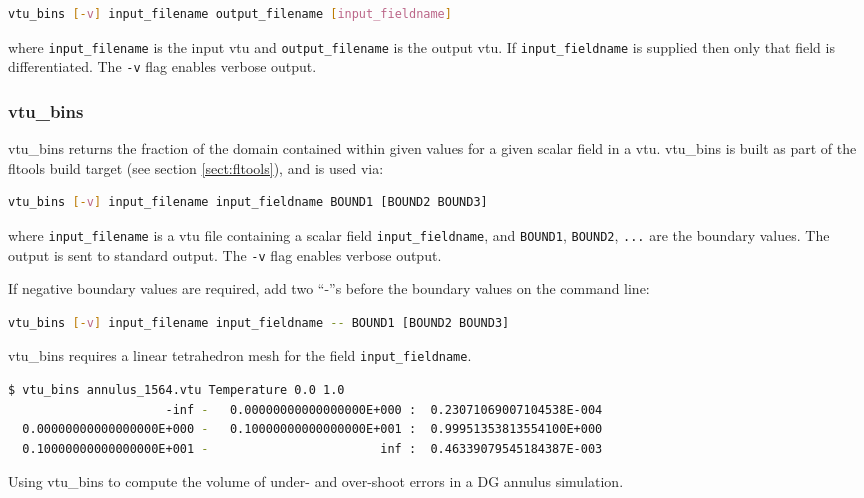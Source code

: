 \begin{lstlisting}[language = Bash]
vtu_bins [-v] input_filename output_filename [input_fieldname]
\end{lstlisting}

where \lstinline[language = Bash]+input_filename+ is the input vtu and
\lstinline[language = Bash]+output_filename+ is the output vtu. If
\lstinline[language = Bash]+input_fieldname+ is supplied then only that field
is differentiated. The \lstinline[language = Bash]+-v+ flag enables verbose output.


\subsubsection{vtu\_bins}
\label{sect:vtu_bins}

vtu\_bins returns the fraction of the domain contained within given values
for a given scalar field in a vtu. vtu\_bins is built as part of the fltools
build target (see section \ref{sect:fltools}), and is used via:

\begin{lstlisting}[language = Bash]
vtu_bins [-v] input_filename input_fieldname BOUND1 [BOUND2 BOUND3]
\end{lstlisting}

where \lstinline[language = Bash]+input_filename+ is a vtu file containing a scalar
field \lstinline[language = Bash]+input_fieldname+, and
\lstinline[language = Bash]+BOUND1+, \lstinline[language = Bash]+BOUND2+,
\lstinline[language = Bash]+...+ are the boundary values. The output is sent to
standard output. The \lstinline[language = Bash]+-v+ flag enables verbose output.

If negative boundary values are required, add two ``-''s before the boundary
values on the command line:

\begin{lstlisting}[language = Bash]
vtu_bins [-v] input_filename input_fieldname -- BOUND1 [BOUND2 BOUND3]
\end{lstlisting}

vtu\_bins requires a linear tetrahedron mesh for the field
\lstinline[language = Bash]+input_fieldname+.

\begin{example}
  \begin{lstlisting}[language = Bash]
$ vtu_bins annulus_1564.vtu Temperature 0.0 1.0
                      -inf -   0.00000000000000000E+000 :  0.23071069007104538E-004
  0.00000000000000000E+000 -   0.10000000000000000E+001 :  0.99951353813554100E+000
  0.10000000000000000E+001 -                        inf :  0.46339079545184387E-003
  \end{lstlisting}
\caption{Using vtu\_bins to compute the volume of under- and over-shoot errors in
         a DG annulus simulation.}
\end{example}

